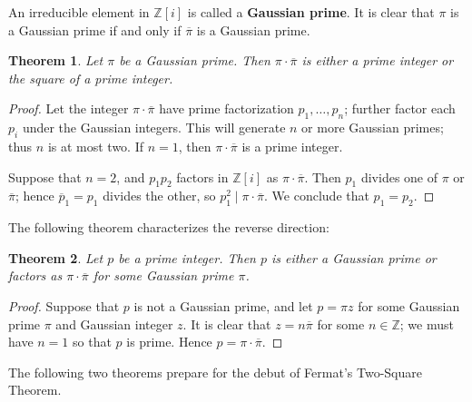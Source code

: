 \documentclass[11pt]{article}
\newtheorem{theorem}{Theorem}
\newcommand{\conjugate}[1]{\overline{#1}}
\begin{document}
An irreducible element in $\mathbb{Z}[i]$ is called a \textbf{Gaussian prime}. It is clear that $\pi$ is a Gaussian prime if and only if $\conjugate{\pi}$ is a Gaussian prime.

\begin{adjustwidth}{0.5cm}{}
  \begin{theorem}
    Let $\pi$ be a Gaussian prime. Then $\pi \cdot \conjugate{\pi}$ is either a prime integer or the square of a prime integer.
  \end{theorem}
  \begin{proof}
    Let the integer $\pi \cdot \conjugate{\pi}$ have prime factorization $p_{1}, \ldots, p_{n}$; further factor each $p_{i}$ under the Gaussian integers. This will generate $n$ or more Gaussian primes; thus $n$ is at most two. If $n = 1$, then $\pi \cdot \conjugate{\pi}$ is a prime integer.

    Suppose that $n = 2$, and $p_{1}p_{2}$ factors in $\mathbb{Z}[i]$ as $\pi \cdot \conjugate{\pi}$. Then $p_{1}$ divides one of $\pi$ or $\conjugate{\pi}$; hence $\conjugate{p}_{1} = p_{1}$ divides the other, so $p_{1}^{2} \mid \pi \cdot \conjugate{\pi}$. We conclude that $p_{1} = p_{2}$.
  \end{proof}
\end{adjustwidth}

The following theorem characterizes the reverse direction:

\begin{adjustwidth}{0.5cm}{}
  \begin{theorem}
    Let $p$ be a prime integer. Then $p$ is either a Gaussian prime or factors as $\pi \cdot \conjugate{\pi}$ for some Gaussian prime $\pi$.
  \end{theorem}
  \begin{proof}
    Suppose that $p$ is not a Gaussian prime, and let $p = \pi z$ for some Gaussian prime $\pi$ and Gaussian integer $z$. It is clear that $z = n \conjugate{\pi}$ for some $n \in \mathbb{Z}$; we must have $n = 1$ so that $p$ is prime. Hence $p = \pi \cdot \conjugate{\pi}$.
  \end{proof}
\end{adjustwidth}

The following two theorems prepare for the debut of Fermat's Two-Square Theorem.
\end{document}
